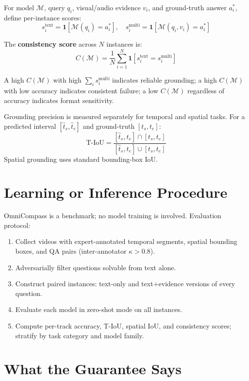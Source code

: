 \documentclass[10pt,twocolumn]{article}
\begin{document}
For model $\mathcal{M}$, query $q_i$, visual/audio evidence $v_i$, and
ground-truth answer $a_i^*$, define per-instance scores:
\[
s_i^{\text{text}} = \mathbf{1}\!\left[\mathcal{M}(q_i) = a_i^*\right],\quad
s_i^{\text{multi}} = \mathbf{1}\!\left[\mathcal{M}(q_i, v_i) = a_i^*\right]
\]

The \textbf{consistency score} across $N$ instances is:
\[
C(\mathcal{M}) = \frac{1}{N}\sum_{i=1}^{N}
  \mathbf{1}\!\left[s_i^{\text{text}} = s_i^{\text{multi}}\right]
\]

A high $C(\mathcal{M})$ with high $\sum_i s_i^{\text{multi}}$ indicates
reliable grounding; a high $C(\mathcal{M})$ with low accuracy indicates
consistent failure; a low $C(\mathcal{M})$ regardless of accuracy
indicates format sensitivity.

Grounding precision is measured separately for temporal and spatial tasks.
For a predicted interval $[\hat{t}_s, \hat{t}_e]$ and ground-truth
$[t_s, t_e]$:
\[
\mathrm{T\text{-}IoU} =
\frac{[\hat{t}_s, \hat{t}_e]\cap[t_s, t_e]}{[\hat{t}_s, \hat{t}_e]\cup[t_s, t_e]}
\]
Spatial grounding uses standard bounding-box IoU.

\section{Learning or Inference Procedure}

OmniCompass is a benchmark; no model training is involved. Evaluation
protocol:

\begin{enumerate}[itemsep=2pt,parsep=0pt]
  \item Collect videos with expert-annotated temporal segments, spatial
    bounding boxes, and QA pairs (inter-annotator $\kappa > 0.8$).
  \item Adversarially filter questions solvable from text alone.
  \item Construct paired instances: text-only and text$+$evidence versions
    of every question.
  \item Evaluate each model in zero-shot mode on all instances.
  \item Compute per-track accuracy, T-IoU, spatial IoU, and consistency
    scores; stratify by task category and model family.
\end{enumerate}

\section{What the Guarantee Says}
\end{document}
